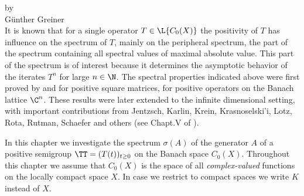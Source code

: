 \setcounter{section}{0}
\label{chap:b3}%
\thispagestyle{empty}
{\Large
\vspace*{-.75cm}
by \\[.25em]
Günther Greiner
\vspace{.75cm}
\\
}
It is known that for a single operator $T \in \L{C_{0}(X)}$ the positivity of\/ $T$ has influence on the spectrum of\/ $T$, mainly on the peripheral spectrum, \ie the part of the spectrum containing all spectral values of maximal absolute value.
This part of the spectrum is of interest because it determines the asymptotic behavior of the iterates $T^{n}$ for large $n \in \N$.
The spectral properties indicated above were first proved by \textcite{perron:1907} and \textcite{frobenius:1909} for positive square matrices, \ie for positive operators on the Banach lattice $\C^{n}$.
These results were later extended to the infinite dimensional setting, with important contributions from Jentzsch, Karlin, Krein, Krasnoselski'i, Lotz, Rota, Rutman, Schaefer and others (see Chapt.V of \textcite{schaefer:1974}).

In this chapter we investigate the spectrum $\sigma(A)$ of the generator $A$ of a positive semigroup $\TT = (T(t))_{t \geq 0}$ on the Banach space $C_{0}(X)$.
Throughout this chapter we assume that $C_{0}(X)$ is the space of all \emph{complex-valued} functions on the locally compact space $X$.
In case we restrict to compact spaces we write $K$ instead of\/ $X$.
